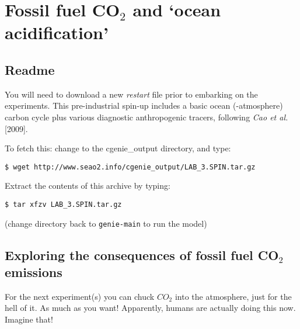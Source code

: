 \documentclass[11pt,fleqn]{book} %
\begin{document}
\chapter{Fossil fuel CO$_{2}$ and ‘ocean acidification’}

\hfill \break


\newpage


\section*{Readme}

You will need to download a new \textit{restart} file prior to embarking on the experiments. This pre-industrial spin-up includes a basic ocean (-atmosphere) carbon cycle plus various diagnostic anthropogenic tracers, following \textit{Cao et al.} [2009].

\noindent To fetch this: change to the cgenie\_output directory, and type:
\vspace{-2mm}
\begin{verbatim}
$ wget http://www.seao2.info/cgenie_output/LAB_3.SPIN.tar.gz
\end{verbatim}
\vspace{-2mm}

\noindent Extract the contents of this archive by typing:
\vspace{-2mm}
\begin{verbatim}
$ tar xfzv LAB_3.SPIN.tar.gz 
\end{verbatim}
\vspace{-2mm}
\noindent (change directory back to \texttt{genie-main} to run the model)


\newpage


\section{Exploring the consequences of fossil fuel CO$_{2}$ emissions}

For the next experiment(s) you can chuck \(CO_{2}\) into the atmosphere, just for the hell of it. As much as you want! Apparently, humans are actually doing this now. Imagine that!
\end{document}
